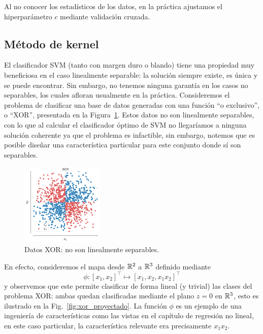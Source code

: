 Al no conocer los estadísticos de los datos, en la práctica ajustamos el hiperparámetro $c$ mediante validación cruzada.

\subsection{Método de kernel}

El clasificador SVM (tanto con margen duro o blando) tiene una propiedad muy beneficiosa en el caso linealmente separable: la solución siempre existe, es única y se puede encontrar. Sin embargo, no tenemos ninguna garantía en los casos no separables, los cuales afloran usualmente en la práctica. Consideremos el problema de clasificar una base de datos generadas con una función ``o exclusivo'', o ``XOR'', presentada en la Figura~\ref{fig:xor}. Estos datos no son linealmente separables, con lo que al calcular el clasificador óptimo  de SVM no llegaríamos a ninguna solución coherente ya que el problema es infactible, sin embargo, notemos que es posible diseñar una característica particular para este conjunto donde sí son separables. 

\begin{figure}[ht]
    \centering
    \includegraphics[width=0.35\textwidth]{img/cap5_xor}
    \caption{Datos XOR: no son linealmente separables.}
    \label{fig:xor}
\end{figure}

En efecto, consideremos el mapa desde  $\mathbb{R}^2$ a $\mathbb{R}^3$ definido mediante
\begin{equation}
    \phi: [x_1, x_2]^\top \mapsto [x_1, x_2, x_1 x_2]^\top
\end{equation}
y observemos que este permite clasificar de forma lineal (y trivial) las clases del problema XOR: ambas quedan clasificadas mediante el plano $z=0$ en $\mathbb{R}^3$, esto es ilustrado en la Fig.~\ref{fig:xor_proyectado}. La función $\phi$ es un ejemplo de una ingeniería de características como las vistas en el capítulo de regresión no lineal, en este caso particular, la característica relevante era precisamente $x_1x_2$.

